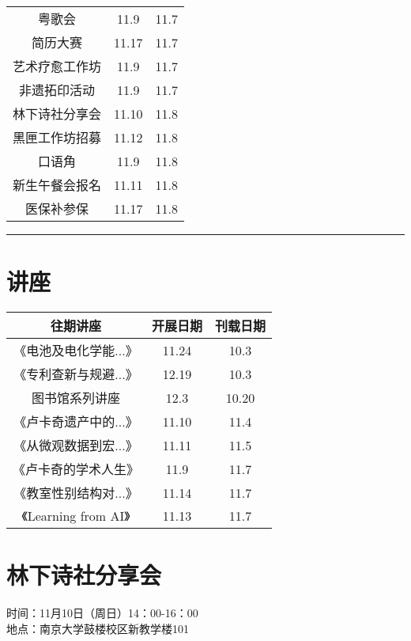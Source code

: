 \documentclass[letterpaper, 12pt]{article}
\begin{document}
\begin{multicols}{2}
{\begin{longtable}{|c|c|c|}
    粤歌会 & 11.9 & 11.7\\
    简历大赛 &11.17 & 11.7\\
    艺术疗愈工作坊 & 11.9 & 11.7\\
    非遗拓印活动 & 11.9 & 11.7\\
    林下诗社分享会 & 11.10 & 11.8\\
    黑匣工作坊招募 & 11.12 & 11.8\\
    口语角 & 11.9 & 11.8\\
    新生午餐会报名 & 11.11 & 11.8\\
    医保补参保 & 11.17 & 11.8\\
    \hline
\end{longtable}
\unskip
\unpenalty
\unpenalty}\unvbox\colbbox
\end{multicols}
\hrule
\pagebreak
\begin{multicols}{2}

\section{讲座}
\begin{tabular}{|c|c|c|}
    \hline
    往期讲座 & 开展日期 & 刊载日期\\
    \hline\hline
    《电池及电化学能...》 & 11.24 & 10.3\\
    《专利查新与规避...》 & 12.19 & 10.3\\
    图书馆系列讲座 & 12.3 & 10.20\\
    《卢卡奇遗产中的...》 & 11.10 & 11.4\\
    《从微观数据到宏...》& 11.11 & 11.5\\
    《卢卡奇的学术人生》 & 11.9 & 11.7\\
    《教室性别结构对...》 & 11.14 & 11.7\\
    《Learning from AI》 & 11.13 & 11.7\\
    
    \hline
\end{tabular}


\section{林下诗社分享会}
时间：11月10日（周日）14：00-16：00\\
地点：南京大学鼓楼校区新教学楼101\\


\end{multicols}
\end{document}
